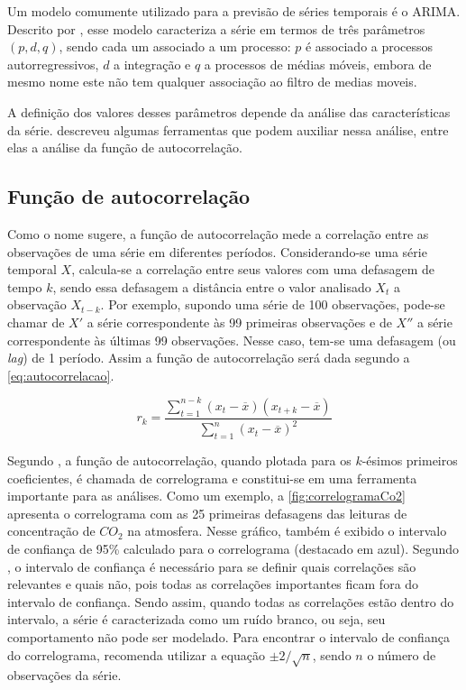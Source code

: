 \documentclass[
    12pt,
    oneside,
    a4paper,
    english,
    brazil
]{abntex2}
\begin{document}
Um modelo comumente utilizado para a  previsão de séries temporais é o ARIMA\@.
Descrito por  , esse  modelo caracteriza a  série em  termos de
três  parâmetros $(p,d,q)$,  sendo  cada  um associado  a  um  processo: $p$  é
associado a processos  autorregressivos, $d$ a integração e $q$  a processos de
médias móveis, embora de mesmo nome  este não tem qualquer associação ao filtro
de medias moveis.

A   definição  dos   valores   desses  parâmetros   depende   da  análise   das
características da  série.   descreveu algumas  ferramentas que
podem auxiliar nessa análise, entre elas a análise da função de autocorrelação.

\subsection{Função de autocorrelação}\label{sec:corre}

Como  o nome  sugere, a  função de  autocorrelação mede  a correlação  entre as
observações  de uma  série em  diferentes períodos.  Considerando-se uma  série
temporal $X$, calcula-se  a correlação entre seus valores com  uma defasagem de
tempo $k$,  sendo essa defasagem  a distância entre  o valor analisado  $X_t$ a
observação  $X_{t-k}$.  Por exemplo,  supondo  uma  série de  100  observações,
pode-se chamar de $X'$ a série  correspondente às 99 primeiras observações e de
$X''$ a série correspondente às últimas  99 observações. Nesse caso, tem-se uma
defasagem (ou \textit{lag}) de 1 período. Assim a função de autocorrelação será
dada segundo a \autoref{eq:autocorrelacao}.

\begin{equation}
    \label{eq:autocorrelacao}
    r_k = \frac{\sum_{t=1}^{n-k}{(x_t - \overline{x})(x_{t+k} -
    \overline{x})}}{\sum_{t=1}^{n}{(x_t - \overline{x})^2}}
\end{equation}

Segundo  ,  a  função   de  autocorrelação,  quando  plotada
para  os  $k$-ésimos  primeiros  coeficientes,  é  chamada  de  correlograma  e
constitui-se em uma ferramenta importante para  as análises. Como um exemplo, a
\autoref{fig:correlogramaCo2}  apresenta o  correlograma  com  as 25  primeiras
defasagens das leituras de concentração  de $CO_2$ na atmosfera. Nesse gráfico,
também é exibido o intervalo de confiança de 95\% calculado para o correlograma
(destacado em  azul). Segundo ,  o intervalo de  confiança é
necessário para se  definir quais correlações são relevantes e  quais não, pois
todas as  correlações importantes ficam  fora do intervalo de  confiança. Sendo
assim,  quando todas  as  correlações  estão dentro  do  intervalo,  a série  é
caracterizada  como  um ruído  branco,  ou  seja,  seu comportamento  não  pode
ser  modelado.  Para  encontrar  o  intervalo  de  confiança  do  correlograma,
 recomenda utilizar a equação $\pm{}2/\sqrt{n}$, sendo $n$ o
número de observações da série.
\end{document}
